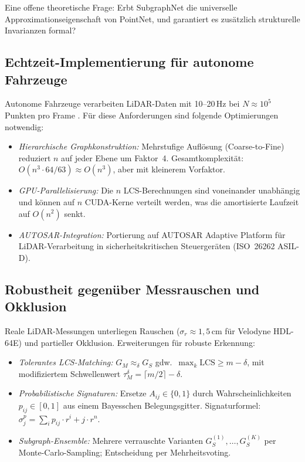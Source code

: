 ﻿\documentclass[a4paper,12pt]{article}
\theoremstyle{definition}
\begin{document}
Eine offene theoretische Frage: Erbt SubgraphNet die universelle
Approximationseigenschaft von PointNet, und garantiert es zusätzlich
strukturelle Invarianzen formal?

\subsection{Echtzeit-Implementierung für autonome Fahrzeuge}

Autonome Fahrzeuge verarbeiten LiDAR-Daten mit 10--20\,Hz bei
$N \approx 10^5$ Punkten pro Frame \citep{Waymo2023}. Für diese
Anforderungen sind folgende Optimierungen notwendig:

\begin{itemize}
  \item \emph{Hierarchische Graphkonstruktion:} Mehrstufige Auflösung
        (Coarse-to-Fine) reduziert $n$ auf jeder Ebene um Faktor~4.
        Gesamtkomplexität: $O(n^3 \cdot 64/63) \approx O(n^3)$, aber
        mit kleinerem Vorfaktor.
  \item \emph{GPU-Parallelisierung:} Die $n$ LCS-Berechnungen sind
        voneinander unabhängig und können auf $n$ CUDA-Kerne verteilt
        werden, was die amortisierte Laufzeit auf $O(n^2)$ senkt.
  \item \emph{AUTOSAR-Integration:} Portierung auf AUTOSAR Adaptive
        Platform \citep{AUTOSAR2023} für LiDAR-Verarbeitung in
        sicherheitskritischen Steuergeräten (ISO~26262 ASIL-D).
\end{itemize}

\subsection{Robustheit gegenüber Messrauschen und Okklusion}

Reale LiDAR-Messungen unterliegen Rauschen ($\sigma_r \approx 1{,}5$\,cm
für Velodyne HDL-64E) und partieller Okklusion. Erweiterungen für
robuste Erkennung:

\begin{itemize}
  \item \emph{Tolerantes LCS-Matching:} $G_M \approx_\delta G_S$ gdw.\
        $\max_k \mathrm{LCS} \geq m - \delta$, mit modifiziertem
        Schwellenwert $\tau_M^\delta = \lceil m/2 \rceil - \delta$.
  \item \emph{Probabilistische Signaturen:} Ersetze $A_{ij} \in
        \{0,1\}$ durch Wahrscheinlichkeiten $p_{ij} \in [0,1]$ aus
        einem Bayesschen Belegungsgitter. Signaturformel:
        $\sigma_j^p = \sum_i p_{ij} \cdot r^i + j \cdot r^n$.
  \item \emph{Subgraph-Ensemble:} Mehrere verrauschte Varianten
        $G_S^{(1)}, \ldots, G_S^{(K)}$ per Monte-Carlo-Sampling;
        Entscheidung per Mehrheitsvoting.
\end{itemize}
\end{document}
